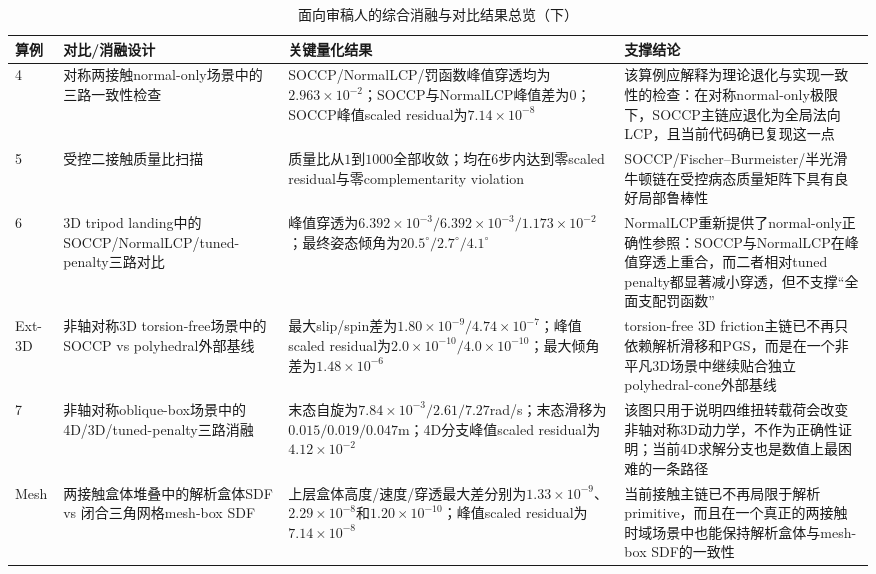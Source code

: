﻿\documentclass[12pt, a4paper]{ctexart}
\theoremstyle{plain}
\theoremstyle{remark}
\begin{document}
\begin{table}[htbp]
    \centering
    \caption{面向审稿人的综合消融与对比结果总览（下）}
    \label{tab:reviewer_summary_b}
    \scriptsize
    \setlength{\tabcolsep}{4pt}
    \renewcommand{\arraystretch}{1.05}
    \begin{tabular}{p{1.0cm}p{3.0cm}p{4.4cm}p{5.0cm}}
        \toprule
        算例 & 对比/消融设计 & 关键量化结果 & 支撑结论 \\
        \midrule
        4 & 对称两接触normal-only场景中的三路一致性检查 & SOCCP/NormalLCP/罚函数峰值穿透均为$2.963\times10^{-2}$；SOCCP与NormalLCP峰值差为$0$；SOCCP峰值scaled residual为$7.14\times10^{-8}$ & 该算例应解释为理论退化与实现一致性的检查：在对称normal-only极限下，SOCCP主链应退化为全局法向LCP，且当前代码确已复现这一点 \\
        5 & 受控二接触质量比扫描 & 质量比从$1$到$1000$全部收敛；均在$6$步内达到零scaled residual与零complementarity violation & SOCCP/Fischer--Burmeister/半光滑牛顿链在受控病态质量矩阵下具有良好局部鲁棒性 \\
        6 & 3D tripod landing中的SOCCP/NormalLCP/tuned-penalty三路对比 & 峰值穿透为$6.392\times10^{-3}/6.392\times10^{-3}/1.173\times10^{-2}$；最终姿态倾角为$20.5^\circ/2.7^\circ/4.1^\circ$ & NormalLCP重新提供了normal-only正确性参照：SOCCP与NormalLCP在峰值穿透上重合，而二者相对tuned penalty都显著减小穿透，但不支撑``全面支配罚函数'' \\
        Ext-3D & 非轴对称3D torsion-free场景中的SOCCP vs polyhedral外部基线 & 最大slip/spin差为$1.80\times10^{-9}/4.74\times10^{-7}$；峰值scaled residual为$2.0\times10^{-10}/4.0\times10^{-10}$；最大倾角差为$1.48\times10^{-6}$ & torsion-free 3D friction主链已不再只依赖解析滑移和PGS，而是在一个非平凡3D场景中继续贴合独立polyhedral-cone外部基线 \\
        7 & 非轴对称oblique-box场景中的4D/3D/tuned-penalty三路消融 & 末态自旋为$7.84\times10^{-3}/2.61/7.27$rad/s；末态滑移为$0.015/0.019/0.047$m；4D分支峰值scaled residual为$4.12\times10^{-2}$ & 该图只用于说明四维扭转载荷会改变非轴对称3D动力学，不作为正确性证明；当前4D求解分支也是数值上最困难的一条路径 \\
        Mesh & 两接触盒体堆叠中的解析盒体SDF vs 闭合三角网格mesh-box SDF & 上层盒体高度/速度/穿透最大差分别为$1.33\times10^{-9}$、$2.29\times10^{-8}$和$1.20\times10^{-10}$；峰值scaled residual为$7.14\times10^{-8}$ & 当前接触主链已不再局限于解析primitive，而且在一个真正的两接触时域场景中也能保持解析盒体与mesh-box SDF的一致性 \\
        \bottomrule
    \end{tabular}
\end{table}
\end{document}
